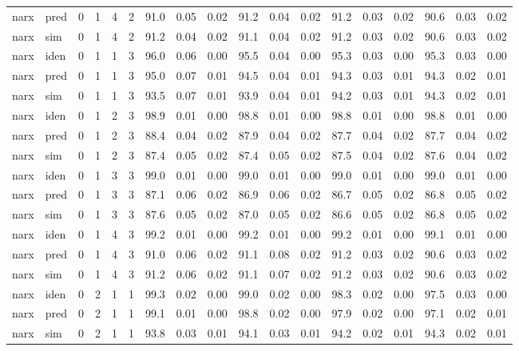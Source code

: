 \begin{landscape}
\begin{center}
\begin{longtable}{ll|cccc|ccc|ccc|ccc|ccc}
narx & pred & 0 & 1 & 4 & 2 & 91.0 & 0.05 & 0.02 & 91.2 & 0.04 & 0.02 & 91.2 & 0.03 & 0.02 & 90.6 & 0.03 & 0.02 \\ 
narx & sim  & 0 & 1 & 4 & 2 & 91.2 & 0.04 & 0.02 & 91.1 & 0.04 & 0.02 & 91.2 & 0.03 & 0.02 & 90.6 & 0.03 & 0.02 \\ 
 \hline 
narx & iden & 0 & 1 & 1 & 3 & 96.0 & 0.06 & 0.00 & 95.5 & 0.04 & 0.00 & 95.3 & 0.03 & 0.00 & 95.3 & 0.03 & 0.00 \\ 
narx & pred & 0 & 1 & 1 & 3 & 95.0 & 0.07 & 0.01 & 94.5 & 0.04 & 0.01 & 94.3 & 0.03 & 0.01 & 94.3 & 0.02 & 0.01 \\ 
narx & sim  & 0 & 1 & 1 & 3 & 93.5 & 0.07 & 0.01 & 93.9 & 0.04 & 0.01 & 94.2 & 0.03 & 0.01 & 94.3 & 0.02 & 0.01 \\ 
 \hline 
narx & iden & 0 & 1 & 2 & 3 & 98.9 & 0.01 & 0.00 & 98.8 & 0.01 & 0.00 & 98.8 & 0.01 & 0.00 & 98.8 & 0.01 & 0.00 \\ 
narx & pred & 0 & 1 & 2 & 3 & 88.4 & 0.04 & 0.02 & 87.9 & 0.04 & 0.02 & 87.7 & 0.04 & 0.02 & 87.7 & 0.04 & 0.02 \\ 
narx & sim  & 0 & 1 & 2 & 3 & 87.4 & 0.05 & 0.02 & 87.4 & 0.05 & 0.02 & 87.5 & 0.04 & 0.02 & 87.6 & 0.04 & 0.02 \\ 
 \hline 
narx & iden & 0 & 1 & 3 & 3 & 99.0 & 0.01 & 0.00 & 99.0 & 0.01 & 0.00 & 99.0 & 0.01 & 0.00 & 99.0 & 0.01 & 0.00 \\ 
narx & pred & 0 & 1 & 3 & 3 & 87.1 & 0.06 & 0.02 & 86.9 & 0.06 & 0.02 & 86.7 & 0.05 & 0.02 & 86.8 & 0.05 & 0.02 \\ 
narx & sim  & 0 & 1 & 3 & 3 & 87.6 & 0.05 & 0.02 & 87.0 & 0.05 & 0.02 & 86.6 & 0.05 & 0.02 & 86.8 & 0.05 & 0.02 \\ 
 \hline 
narx & iden & 0 & 1 & 4 & 3 & 99.2 & 0.01 & 0.00 & 99.2 & 0.01 & 0.00 & 99.2 & 0.01 & 0.00 & 99.1 & 0.01 & 0.00 \\ 
narx & pred & 0 & 1 & 4 & 3 & 91.0 & 0.06 & 0.02 & 91.1 & 0.08 & 0.02 & 91.2 & 0.03 & 0.02 & 90.6 & 0.03 & 0.02 \\ 
narx & sim  & 0 & 1 & 4 & 3 & 91.2 & 0.06 & 0.02 & 91.1 & 0.07 & 0.02 & 91.2 & 0.03 & 0.02 & 90.6 & 0.03 & 0.02 \\ 
 \hline 
narx & iden & 0 & 2 & 1 & 1 & 99.3 & 0.02 & 0.00 & 99.0 & 0.02 & 0.00 & 98.3 & 0.02 & 0.00 & 97.5 & 0.03 & 0.00 \\ 
narx & pred & 0 & 2 & 1 & 1 & 99.1 & 0.01 & 0.00 & 98.8 & 0.02 & 0.00 & 97.9 & 0.02 & 0.00 & 97.1 & 0.02 & 0.01 \\ 
narx & sim  & 0 & 2 & 1 & 1 & 93.8 & 0.03 & 0.01 & 94.1 & 0.03 & 0.01 & 94.2 & 0.02 & 0.01 & 94.3 & 0.02 & 0.01 \\ 

\end{longtable}
\end{center}
\end{landscape}
